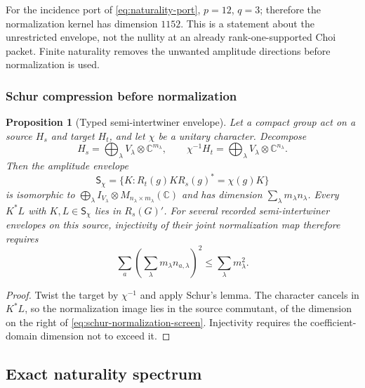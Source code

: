 \documentclass[11pt]{article}
\numberwithin{equation}{section}
\newtheorem{proposition}[theorem]{Proposition}
\theoremstyle{definition}
\theoremstyle{remark}
\newcommand{\C}{\mathbb C}
\begin{document}
For the incidence port of \eqref{eq:naturality-port}, $p=12$, $q=3$;
therefore the normalization kernel has dimension $1152$.  This is a
statement about the unrestricted envelope, not the nullity at an already
rank-one-supported Choi packet.  Finite naturality removes the unwanted
amplitude directions before normalization is used.


\subsubsection{Schur compression before normalization}

\begin{proposition}[Typed semi-intertwiner envelope]
\label{prop:schur-incidence-envelope}
Let a compact group act on a source $H_s$ and target $H_t$, and let $\chi$
be a unitary character.  Decompose
\[
 H_s=\bigoplus_\lambda V_\lambda\otimes\C^{m_\lambda},\qquad
 \chi^{-1}H_t=\bigoplus_\lambda V_\lambda\otimes\C^{n_\lambda}.
\]
Then the amplitude envelope
\[
 \mathsf S_\chi=\{K:R_t(g)KR_s(g)^*=\chi(g)K\}
\]
is isomorphic to
$\bigoplus_\lambda I_{V_\lambda}\otimes
M_{n_\lambda\times m_\lambda}(\C)$ and has dimension
$\sum_\lambda m_\lambda n_\lambda$.
Every $K^*L$ with $K,L\in\mathsf S_\chi$ lies in $R_s(G)'$.
For several recorded semi-intertwiner envelopes on this source, injectivity
of their joint normalization map therefore requires
\begin{equation}
 \sum_a\left(\sum_\lambda m_\lambda n_{a,\lambda}\right)^2
 \le\sum_\lambda m_\lambda^2.
 \label{eq:schur-normalization-screen}
\end{equation}
\end{proposition}

\begin{proof}
Twist the target by $\chi^{-1}$ and apply Schur's lemma.  The character
cancels in $K^*L$, so the normalization image lies in the source commutant,
of the dimension on the right of \eqref{eq:schur-normalization-screen}.
Injectivity requires the coefficient-domain dimension not to exceed it.
\end{proof}


\subsection{Exact naturality spectrum}
\label{app:naturality-spectrum}
\end{document}
